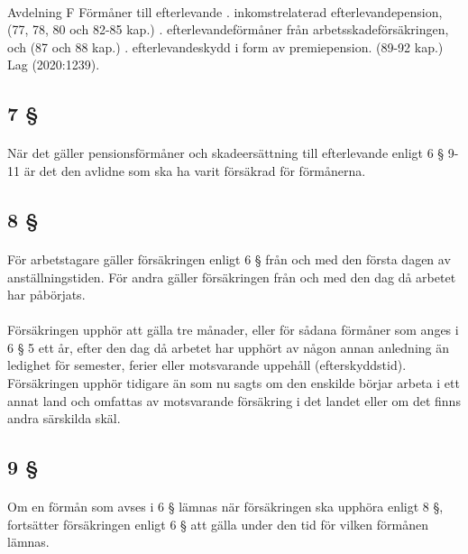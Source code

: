 \documentclass[a4paper,notitlepage,openany,10pt]{book}
\begin{document}
\paragraph*{}
Avdelning F Förmåner till efterlevande
. inkomstrelaterad
efterlevandepension, (77, 78, 80 och 82-85
kap.)
. efterlevandeförmåner från
arbetsskadeförsäkringen, och (87 och 88 kap.)
. efterlevandeskydd i form av
premiepension. (89-92 kap.)
Lag (2020:1239).
\subsection*{7 §}
\paragraph*{}
När det gäller pensionsförmåner och skadeersättning till efterlevande enligt 6 § 9-11 är det den avlidne som ska ha varit försäkrad för förmånerna.
\subsection*{8 §}
\paragraph*{}
För arbetstagare gäller försäkringen enligt 6 § från och med den första dagen av anställningstiden. För andra gäller försäkringen från och med den dag då arbetet har påbörjats.
\paragraph*{}
Försäkringen upphör att gälla tre månader, eller för sådana förmåner som anges i 6 § 5 ett år, efter den dag då arbetet har upphört av någon annan anledning än ledighet för semester, ferier eller motsvarande uppehåll (efterskyddstid).
Försäkringen upphör tidigare än som nu sagts om den enskilde börjar arbeta i ett annat land och omfattas av motsvarande försäkring i det landet eller om det finns andra särskilda skäl.
\subsection*{9 §}
\paragraph*{}
Om en förmån som avses i 6 § lämnas när försäkringen ska upphöra enligt 8 §, fortsätter försäkringen enligt 6 § att gälla under den tid för vilken förmånen lämnas.
\end{document}
